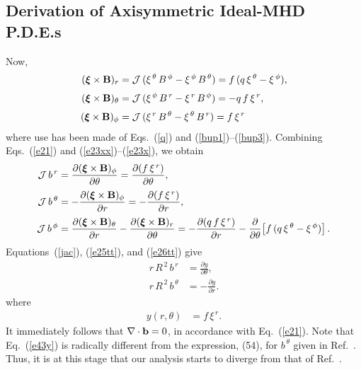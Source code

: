 \documentclass[12pt,prb,aps]{revtex4-1}
\newcommand {\bxi}{\mbox{\boldmath$\xi$}}
\begin{document}
\subsection{Derivation of Axisymmetric Ideal-MHD P.D.E.s}\label{deriv}
Now,\cite{tj}
\begin{align}
(\bxi\times {\bf B})_r&= {\cal J}\,(\xi^{\,\theta}\,B^{\,\phi} - \xi^{\,\phi}\,B^{\,\theta}) = f\,(q\,\xi^{\,\theta}-\xi^{\,\phi}),\label{e23xx}\\[0.5ex]
(\bxi\times {\bf B})_\theta&= {\cal J}\,(\xi^{\,\phi}\,B^{\,r} - \xi^{\,r}\,B^{\,\phi}) = -q\,f\,\xi^{\,r},\\[0.5ex]
(\bxi\times {\bf B})_\phi &= {\cal J}\,(\xi^{\,r}\,B^{\,\theta} - \xi^{\,\theta}\,B^{\,r})= f\,\xi^{\,r}\label{e23x}
\end{align}
where use has been made of  Eqs.~(\ref{q}) and (\ref{bup1})--(\ref{bup3}).
 Combining Eqs.~(\ref{e21}) and (\ref{e23xx})--(\ref{e23x}), we obtain\,\cite{tj}
\begin{align}
{\cal J}\,b^{\,r} &= \frac{\partial (\bxi\times {\bf B})_\phi }{\partial\theta}= \frac{\partial (f\,\xi^{\,r})}{\partial\theta},\label{e25tt}\\[0.5ex]
{\cal J}\,b^{\,\theta} &=-\frac{\partial (\bxi\times {\bf B})_\phi }{\partial r}= -\frac{\partial (f\,\xi^{\,r})}{\partial r},\label{e26tt}\\[0.5ex]
{\cal J}\,b^{\,\phi}&=\frac{\partial (\bxi\times {\bf B})_\theta}{\partial r}-\frac{\partial (\bxi\times {\bf B})_r }{\partial \theta}=
 -\frac{\partial (q\,f\,\xi^{\,r})}{\partial r} - \frac{\partial}{\partial\theta}\!\left[f\,(q\,\xi^{\,\theta}-\xi^{\,\phi})\right].\label{e27tt}
\end{align}
Equations~(\ref{jac}), (\ref{e25tt}), and (\ref{e26tt}) give\,\cite{tj}
\begin{align}\label{e41}
r\,R^{\,2}\,b^{\,r}& = \frac{\partial y}{\partial\theta},\\[0.5ex]
r\,R^{\,2}\,b^{\,\theta} &= - \frac{\partial y}{\partial r}.\label{e43y}
\end{align}
where 
\begin{align}\label{e42}
y(r,\theta) &=f\,\xi^{\,r}.
\end{align}
It immediately follows that $\nabla\cdot{\bf b} =0$, in accordance with  Eq.~(\ref{e21}). 
Note that Eq.~(\ref{e43y}) is radically different from the expression, (54), for $b^{\,\theta}$ given in Ref.~. Thus, it is at this stage that our analysis
starts to diverge from that of Ref.~.
\end{document}
